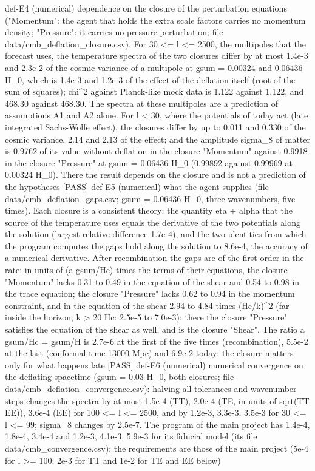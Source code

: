 \documentclass[
  10pt,
]{article}
\newenvironment{Shaded}{}{}
\newcommand{\NormalTok}[1]{#1}
\begin{document}
\begin{Shaded}
\begin{Highlighting}[]
\NormalTok{[PASS] def{-}E4  (numerical) dependence on the closure of the perturbation equations ("Momentum": the agent that holds the extra scale factors carries no momentum density; "Pressure": it carries no pressure perturbation; file data/cmb\_deflation\_closure.csv). For 30 \textless{}= l \textless{}= 2500, the multipoles that the forecast uses, the temperature spectra of the two closures differ by at most 1.4e{-}3 and 2.3e{-}2 of the cosmic variance of a multipole at gsum = 0.00324 and 0.06436 H\_0, which is 1.4e{-}3 and 1.2e{-}3 of the effect of the deflation itself (root of the sum of squares); chi\^{}2 against Planck{-}like mock data is 1.122 against 1.122, and 468.30 against 468.30. The spectra at these multipoles are a prediction of assumptions A1 and A2 alone. For l \textless{} 30, where the potentials of today act (late integrated Sachs{-}Wolfe effect), the closures differ by up to 0.011 and 0.330 of the cosmic variance, 2.14 and 2.13 of the effect; and the amplitude sigma\_8 of matter is 0.9762 of its value without deflation in the closure "Momentum" against 0.9918 in the closure "Pressure" at gsum = 0.06436 H\_0 (0.99892 against 0.99969 at 0.00324 H\_0). There the result depends on the closure and is not a prediction of the hypotheses}
\NormalTok{[PASS] def{-}E5  (numerical) what the agent supplies (file data/cmb\_deflation\_gaps.csv; gsum = 0.06436 H\_0, three wavenumbers, five times). Each closure is a consistent theory: the quantity eta\textquotesingle{} + alpha\textquotesingle{}\textquotesingle{} that the source of the temperature uses equals the derivative of the two potentials along the solution (largest relative difference 1.7e{-}4), and the two identities from which the program computes the gaps hold along the solution to 8.6e{-}4, the accuracy of a numerical derivative. After recombination the gaps are of the first order in the rate: in units of (a gsum/Hc) times the terms of their equations, the closure "Momentum" lacks 0.31 to 0.49 in the equation of the shear and 0.54 to 0.98 in the trace equation; the closure "Pressure" lacks 0.62 to 0.94 in the momentum constraint, and in the equation of the shear 2.94 to 4.84 times (Hc/k)\^{}2 (far inside the horizon, k \textgreater{} 20 Hc: 2.5e{-}5 to 7.0e{-}3): there the closure "Pressure" satisfies the equation of the shear as well, and is the closure "Shear". The ratio a gsum/Hc = gsum/H is 2.7e{-}6 at the first of the five times (recombination), 5.5e{-}2 at the last (conformal time 13000 Mpc) and 6.9e{-}2 today: the closure matters only for what happens late}
\NormalTok{[PASS] def{-}E6  (numerical) numerical convergence on the deflating spacetime (gsum = 0.03 H\_0, both closures; file data/cmb\_deflation\_convergence.csv): halving all tolerances and wavenumber steps changes the spectra by at most 1.5e{-}4 (TT), 2.0e{-}4 (TE, in units of sqrt(TT EE)), 3.6e{-}4 (EE) for 100 \textless{}= l \textless{}= 2500, and by 1.2e{-}3, 3.3e{-}3, 3.5e{-}3 for 30 \textless{}= l \textless{}= 99; sigma\_8 changes by 2.5e{-}7. The program of the main project has 1.4e{-}4, 1.8e{-}4, 3.4e{-}4 and 1.2e{-}3, 4.1e{-}3, 5.9e{-}3 for its fiducial model (its file data/cmb\_convergence.csv); the requirements are those of the main project (5e{-}4 for l \textgreater{}= 100; 2e{-}3 for TT and 1e{-}2 for TE and EE below)}

\end{Highlighting}
\end{Shaded}
\end{document}
